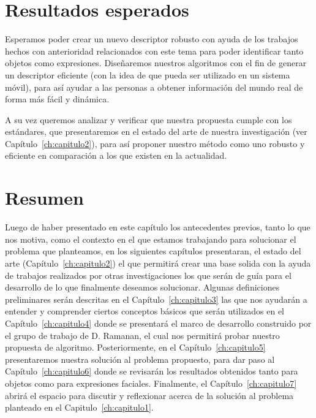 \section{Resultados esperados}
Esperamos poder crear un nuevo descriptor robusto con ayuda de los trabajos hechos con anterioridad relacionados con este tema para poder identificar tanto objetos como expresiones. Diseñaremos nuestros algoritmos con el fin de generar un descriptor eficiente (con la idea de que pueda ser utilizado en un sistema móvil), para así ayudar a las personas a obtener información del mundo real de forma más fácil y dinámica.

A su vez queremos analizar y verificar que nuestra propuesta cumple con los estándares, que presentaremos en el estado del arte de nuestra investigación (ver Capítulo~\ref{ch:capitulo2}), para así proponer nuestro método como uno robusto y eficiente en comparación a los que existen en la actualidad.

\section{Resumen}

Luego de haber presentado en este capítulo los antecedentes previos, tanto lo que nos motiva, como el contexto en el que estamos trabajando para solucionar el problema que planteamos, en los siguientes capítulos presentaran, el estado del arte (Capítulo~\ref{ch:capitulo2}) el que permitirá crear una base solida con la ayuda de trabajos realizados por otras investigaciones los que serán de guía para el desarrollo de lo que finalmente deseamos solucionar. Algunas definiciones preliminares serán descritas en el Capítulo~\ref{ch:capitulo3} las que nos ayudarán a entender y comprender ciertos conceptos básicos que serán utilizados en el Capítulo~\ref{ch:capitulo4} donde se presentará el marco de desarrollo construido por el grupo de trabajo de D. Ramanan, el cual nos permitirá probar nuestro propuesta de algoritmo. Posteriormente, en el Capítulo~\ref{ch:capitulo5} presentaremos nuestra solución al problema propuesto, para dar paso al Capítulo~\ref{ch:capitulo6} donde se revisarán los resultados obtenidos tanto para objetos como para expresiones faciales. Finalmente, el Capítulo~\ref{ch:capitulo7} abrirá el espacio para discutir y reflexionar acerca de la solución al problema planteado en el Capitulo~\ref{ch:capitulo1}.